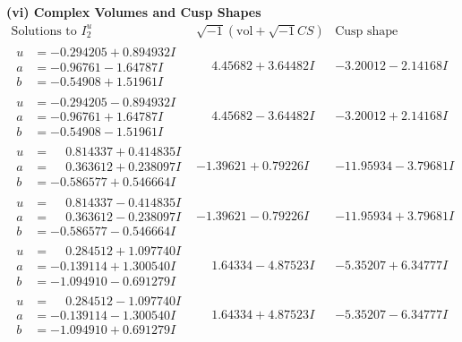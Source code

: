 \documentclass[1p]{elsarticle_modified}
\theoremstyle{definition}
\newcommand{\I}{\sqrt{-1}}
\begin{document}
\newpage\flushleft \textbf{(vi) Complex Volumes and Cusp Shapes}
$$\begin{array}{c|c|c}  
\text{Solutions to }I^u_{2}& \I (\text{vol} + \sqrt{-1}CS) & \text{Cusp shape}\\
 \hline 
\begin{aligned}
u &= -0.294205 + 0.894932 I \\
a &= -0.96761 - 1.64787 I \\
b &= -0.54908 + 1.51961 I\end{aligned}
 & \phantom{-}4.45682 + 3.64482 I & -3.20012 - 2.14168 I \\ \hline\begin{aligned}
u &= -0.294205 - 0.894932 I \\
a &= -0.96761 + 1.64787 I \\
b &= -0.54908 - 1.51961 I\end{aligned}
 & \phantom{-}4.45682 - 3.64482 I & -3.20012 + 2.14168 I \\ \hline\begin{aligned}
u &= \phantom{-}0.814337 + 0.414835 I \\
a &= \phantom{-}0.363612 + 0.238097 I \\
b &= -0.586577 + 0.546664 I\end{aligned}
 & -1.39621 + 0.79226 I & -11.95934 - 3.79681 I \\ \hline\begin{aligned}
u &= \phantom{-}0.814337 - 0.414835 I \\
a &= \phantom{-}0.363612 - 0.238097 I \\
b &= -0.586577 - 0.546664 I\end{aligned}
 & -1.39621 - 0.79226 I & -11.95934 + 3.79681 I \\ \hline\begin{aligned}
u &= \phantom{-}0.284512 + 1.097740 I \\
a &= -0.139114 + 1.300540 I \\
b &= -1.094910 - 0.691279 I\end{aligned}
 & \phantom{-}1.64334 - 4.87523 I & -5.35207 + 6.34777 I \\ \hline\begin{aligned}
u &= \phantom{-}0.284512 - 1.097740 I \\
a &= -0.139114 - 1.300540 I \\
b &= -1.094910 + 0.691279 I\end{aligned}
 & \phantom{-}1.64334 + 4.87523 I & -5.35207 - 6.34777 I \\ \hline\begin{aligned}

\end{aligned}
\end{array}$$
\end{document}
